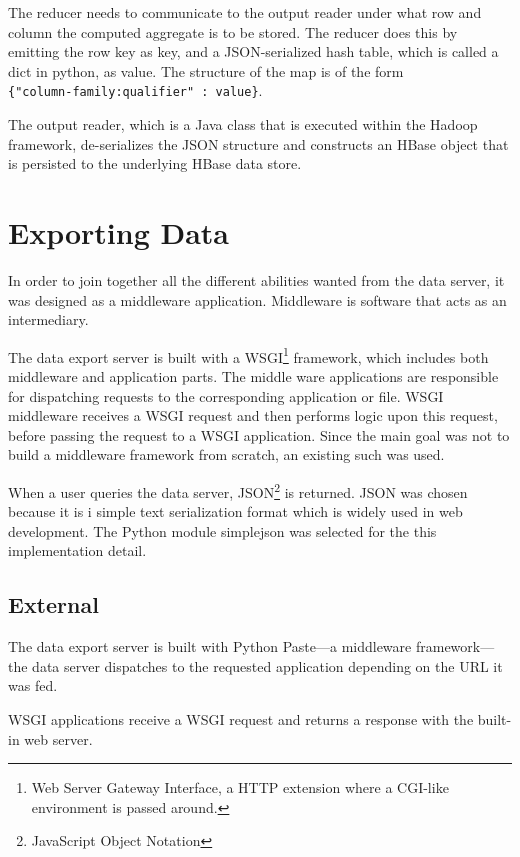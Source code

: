 The reducer needs to communicate to the output reader under what row and column
the computed aggregate is to be stored. The reducer does this by emitting the
row key as key, and a JSON-serialized hash table, which is called a dict in
python, as value. The structure of the map is of the form \\
\texttt{\{"column-family:qualifier" : value\}}.

The output reader, which is a Java class that is executed within the Hadoop
framework, de-serializes the JSON structure and constructs an HBase object that
is persisted to the underlying HBase data store.


\section{Exporting Data}

In order to join together all the different abilities wanted from the data
server, it was designed as a middleware application. Middleware is software
that acts as an intermediary.

The data export server is built with a WSGI\footnote{Web Server Gateway
Interface, a HTTP extension where a CGI-like environment is passed around.}
framework, which includes both middleware and application parts. The middle
ware applications are responsible for dispatching requests to the corresponding
application or file. WSGI middleware receives a WSGI request and then performs
logic upon this request, before passing the request to a WSGI application.
\cite{paste,definitive_guide_to_pylons} Since the main goal was not to build a
middleware framework from scratch, an existing such was used.

When a user queries the data server, JSON\footnote{JavaScript Object Notation}
is returned. JSON was chosen because it is i simple text serialization format
which is widely used in web development. The Python module simplejson was
selected for the this implementation detail. \cite{simplejson}


\subsection*{External}

The data export server is built with Python Paste---a middleware
framework---the data server dispatches to the requested application
depending on the URL it was fed. \cite{paste}

WSGI applications receive a WSGI request and returns a response with the
built-in web server.


